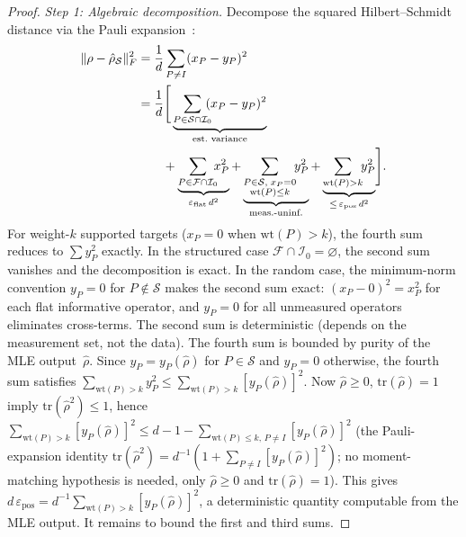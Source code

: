 \documentclass[twocolumn,prx,aps,superscriptaddress,longbibliography,floatfix]{revtex4-2}
\begin{document}
\begin{proof}
\emph{Step 1: Algebraic decomposition.}
Decompose the squared Hilbert--Schmidt distance via the Pauli
expansion~\cite{Paris2004,Holevo2011}:
\begin{align}
  \|\rho - \hat\rho_{\mathcal{S}}\|_F^2
  &= \frac{1}{d}\sum_{P \neq I} (x_P - y_P)^2 \notag \\
  &= \frac{1}{d}\Biggl[\,
  \underbrace{\sum_{P \in \mathcal{S} \cap \mathcal{I}_0}
  \!\!\!(x_P - y_P)^2}_{\text{est.\ variance}} \notag \\
  &\qquad
  +\underbrace{\sum_{P \in \mathcal{F} \cap \mathcal{I}_0}
  \!\!\!x_P^2}_{\varepsilon_{\mathrm{flat}}\,d^2}
  +\underbrace{\sum_{\substack{P \in \mathcal{S},\; x_P = 0 \\
  \mathrm{wt}(P) \le k}}
  \!\!y_P^2}_{\text{meas.-uninf.}}
  +\underbrace{\sum_{\mathrm{wt}(P)>k}
  \!\!y_P^2}_{\le\,\varepsilon_{\mathrm{pos}}\,d^2}
  \Biggr].
  \label{eq:fidelity-decomp}
\end{align}
For weight-$k$ supported targets ($x_P = 0$ when $\mathrm{wt}(P) > k$),
the fourth sum reduces to $\sum y_P^2$ exactly.
In the structured case $\mathcal{F}\cap\mathcal{I}_0 = \varnothing$,
the second sum vanishes and the decomposition is exact.
In the random case, the minimum-norm convention
$y_P = 0$ for $P \notin \mathcal{S}$ makes the second sum
exact: $(x_P - 0)^2 = x_P^2$ for each flat informative
operator, and $y_P = 0$ for all unmeasured operators
eliminates cross-terms.
The second sum is
deterministic (depends on the measurement set, not the data).
The fourth sum is bounded by purity of the MLE output~$\hat\rho$.
Since $y_P = y_P(\hat\rho)$ for $P \in \mathcal{S}$
and $y_P = 0$ otherwise, the fourth sum satisfies
$\sum_{\mathrm{wt}(P)>k} y_P^2
\le \sum_{\mathrm{wt}(P)>k} [y_P(\hat\rho)]^2$.
Now $\hat\rho \ge 0$, $\mathrm{tr}(\hat\rho) = 1$ imply
$\mathrm{tr}(\hat\rho^2) \le 1$, hence
$\sum_{\mathrm{wt}(P)>k} [y_P(\hat\rho)]^2 \le d - 1 -
\sum_{\mathrm{wt}(P) \le k,\, P \neq I} [y_P(\hat\rho)]^2$
(the Pauli-expansion identity
$\mathrm{tr}(\hat\rho^2) = d^{-1}(1 + \sum_{P\neq I} [y_P(\hat\rho)]^2)$;
no moment-matching hypothesis
is needed, only $\hat\rho \ge 0$ and $\mathrm{tr}(\hat\rho)=1$).
This gives $d\,\varepsilon_{\mathrm{pos}} =
d^{-1}\sum_{\mathrm{wt}(P)>k} [y_P(\hat\rho)]^2$, a deterministic
quantity computable from the MLE output.
It remains to bound the first and third sums.


\end{proof}
\end{document}

